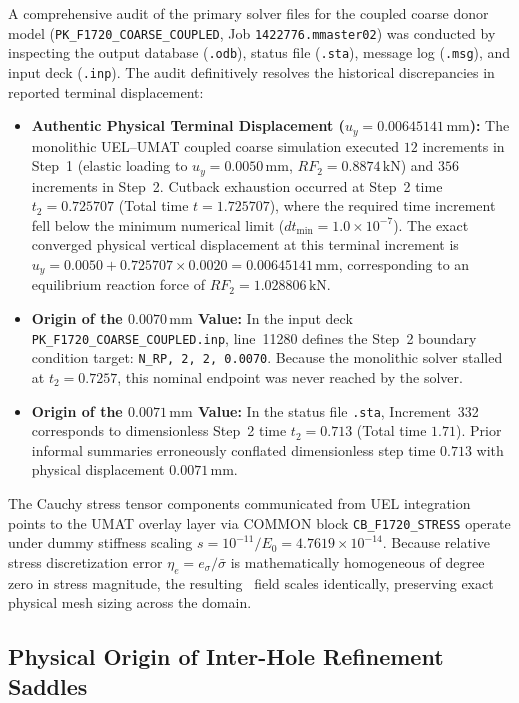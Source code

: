 A comprehensive audit of the primary solver files for the coupled coarse donor model (\texttt{PK\_F1720\_COARSE\_COUPLED}, Job \texttt{1422776.mmaster02}) was conducted by inspecting the output database (\texttt{.odb}), status file (\texttt{.sta}), message log (\texttt{.msg}), and input deck (\texttt{.inp}). The audit definitively resolves the historical discrepancies in reported terminal displacement:
\begin{itemize}
  \item \textbf{Authentic Physical Terminal Displacement ($u_y = 0.00645141\,\mathrm{mm}$):} The monolithic UEL--UMAT coupled coarse simulation executed $12$ increments in Step~1 (elastic loading to $u_y = 0.0050\,\mathrm{mm}$, $RF_2 = 0.8874\,\mathrm{kN}$) and $356$ increments in Step~2. Cutback exhaustion occurred at Step~2 time $t_2 = 0.725707$ (Total time $t = 1.725707$), where the required time increment fell below the minimum numerical limit ($dt_{\min} = 1.0 \times 10^{-7}$). The exact converged physical vertical displacement at this terminal increment is $u_y = 0.0050 + 0.725707 \times 0.0020 = 0.00645141\,\mathrm{mm}$, corresponding to an equilibrium reaction force of $RF_2 = 1.028806\,\mathrm{kN}$.
  \item \textbf{Origin of the $0.0070\,\mathrm{mm}$ Value:} In the input deck \texttt{PK\_F1720\_COARSE\_COUPLED.inp}, line~11280 defines the Step~2 boundary condition target: \texttt{N\_RP, 2, 2, 0.0070}. Because the monolithic solver stalled at $t_2 = 0.7257$, this nominal endpoint was never reached by the solver.
  \item \textbf{Origin of the $0.0071\,\mathrm{mm}$ Value:} In the status file \texttt{.sta}, Increment~332 corresponds to dimensionless Step~2 time $t_2 = 0.713$ (Total time $1.71$). Prior informal summaries erroneously conflated dimensionless step time $0.713$ with physical displacement $0.0071\,\mathrm{mm}$.
\end{itemize}

The Cauchy stress tensor components communicated from UEL integration points to the UMAT overlay layer via COMMON block \texttt{CB\_F1720\_STRESS} operate under dummy stiffness scaling $s = 10^{-11}/E_0 = 4.7619 \times 10^{-14}$. Because relative stress discretization error $\eta_e = e_\sigma / \bar{\sigma}$ is mathematically homogeneous of degree zero in stress magnitude, the resulting \MISESERI\ field scales identically, preserving exact physical mesh sizing across the domain.

\subsection{Physical Origin of Inter-Hole Refinement Saddles}
\label{subsec:f1725_error_saddle_physics}

